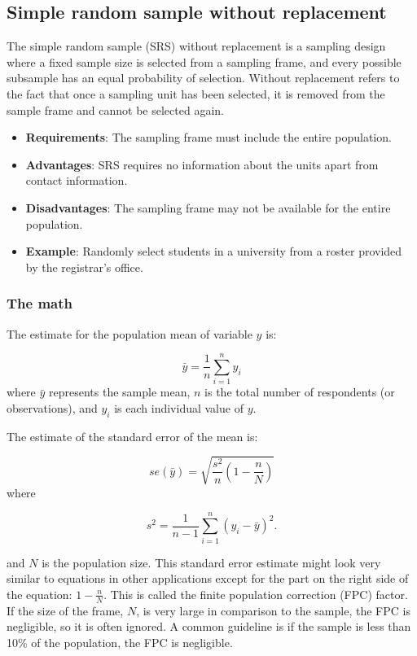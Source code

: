 \documentclass[
]{krantz}
\providecommand{\tightlist}{%
  \setlength{\itemsep}{0pt}\setlength{\parskip}{0pt}}
\begin{document}
\hypertarget{simple-random-sample-without-replacement}{%
\subsection{Simple random sample without replacement}\label{simple-random-sample-without-replacement}}

The simple random sample (SRS) without replacement is a sampling design where a fixed sample size is selected from a sampling frame, and every possible subsample has an equal probability of selection. Without replacement refers to the fact that once a sampling unit has been selected, it is removed from the sample frame and cannot be selected again.

\begin{itemize}
\tightlist
\item
  \textbf{Requirements}: The sampling frame must include the entire population.
\item
  \textbf{Advantages}: SRS requires no information about the units apart from contact information.
\item
  \textbf{Disadvantages}: The sampling frame may not be available for the entire population.
\item
  \textbf{Example}: Randomly select students in a university from a roster provided by the registrar's office.
\end{itemize}

\hypertarget{the-math}{%
\subsubsection*{The math}\label{the-math}}


The estimate for the population mean of variable \(y\) is:

\[\bar{y}=\frac{1}{n}\sum_{i=1}^n y_i\]
where \(\bar{y}\) represents the sample mean, \(n\) is the total number of respondents (or observations), and \(y_i\) is each individual value of \(y\).

The estimate of the standard error of the mean is:

\[se(\bar{y})=\sqrt{\frac{s^2}{n}\left( 1-\frac{n}{N} \right)}\] where

\[s^2=\frac{1}{n-1}\sum_{i=1}^n\left(y_i-\bar{y}\right)^2.\]

and \(N\) is the population size. This standard error estimate might look very similar to equations in other applications except for the part on the right side of the equation: \(1-\frac{n}{N}\). This is called the finite population correction (FPC) factor. If the size of the frame, \(N\), is very large in comparison to the sample, the FPC is negligible, so it is often ignored. A common guideline is if the sample is less than 10\% of the population, the FPC is negligible.
\end{document}
